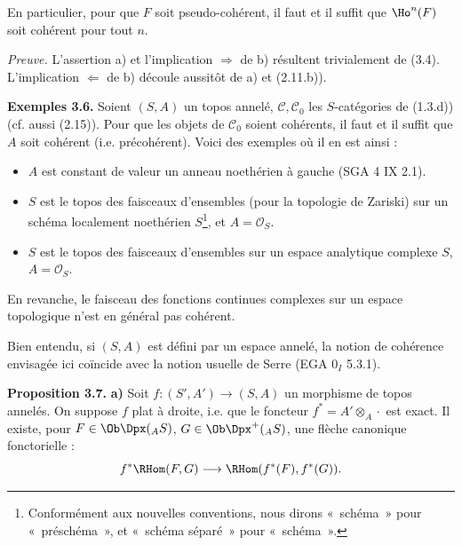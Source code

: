 En
particulier, pour que \(F\) soit pseudo-cohérent, il faut et il suffit que \(\Ho^n(F)\) soit cohérent pour tout \(n\).

\emph{Preuve.} L'assertion a) et l'implication \(\Rightarrow\) de b) résultent trivialement de (3.4). L'implication \(\Leftarrow\) de b) découle aussitôt de a) et (2.11.b)).

\textbf{Exemples 3.6.} Soient \((S,A)\) un topos annelé, \(\mathcal C,\mathcal C_0\) les \(S\)-catégories de (1.3.d)) (cf. aussi (2.15)). Pour que les objets de \(\mathcal C_0\) soient cohérents, il faut et il suffit que \(A\) soit cohérent (i.e. précohérent). Voici des exemples où il en est ainsi :
\begin{itemize}[label=--]
\item \(A\) est constant de valeur un anneau noethérien à gauche (SGA 4 IX 2.1).
\item \(S\) est le topos des faisceaux d'ensembles (pour la topologie de Zariski) sur un schéma localement noethérien \(S\)\footnote{Conformément aux nouvelles conventions, nous dirons «~schéma~» pour «~préschéma~», et «~schéma séparé~» pour «~schéma~».}, et \(A=\mathcal O_S\).
\item \(S\) est le topos des faisceaux d'ensembles sur un espace analytique complexe \(S\), \(A=\mathcal O_S\).
\end{itemize}
En revanche, le faisceau des fonctions continues complexes sur un espace topologique n'est en général pas cohérent.

Bien entendu, si \((S,A)\) est défini par un espace annelé, la notion de cohérence envisagée ici coïncide avec la notion usuelle de Serre (EGA \(0_I\) 5.3.1).

\textbf{Proposition 3.7.} \textbf{a)} Soit \(f:(S',A')\to(S,A)\) un morphisme de topos annelés. On suppose \(f\) plat à droite, i.e. que le foncteur \(f^*=A'\otimes_A\cdot\) est exact. Il existe, pour \(F\in\Ob\Dpx(_A S)\), \(G\in\Ob\Dpx^+(_A S)\), une flèche canonique fonctorielle :
\[
  f^*\RHom(F,G)\longrightarrow\RHom(f^*(F),f^*(G)).
\]
